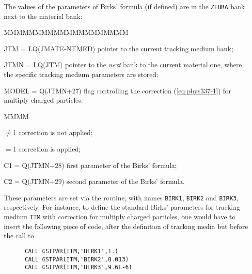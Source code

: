 The values of the parameters of Birks' formula (if defined) are in the
{\tt ZEBRA} bank next to the material bank:
\begin{DLtt}{MMMMMMMMMMMMMMMMMMMM}
\item[JTM = LQ(JMATE-NTMED)] pointer to the current tracking medium bank;
\item[JTMN = LQ(JTM)] pointer to the {\it next} bank to the current
material one, where the specific tracking medium parameters are stored;
\item[MODEL = Q(JTMN+27)] flag controlling the correction (\ref{eq:phys337-1})
for multiply charged particles:
\begin{DLtt}{MMMM}
\item[$\neq$1] correction is not applied;
\item[$=$1] correction is applied;
\end{DLtt}
\item[C1 = Q(JTMN+28)] first parameter of the Birks' formula;
\item[C2 = Q(JTMN+29)] second parameter of the Birks' formula.
\end{DLtt}
These parameters are set via the  routine, with
names {\tt BIRK1}, {\tt BIRK2} and {\tt BIRK3}, respectively. For instance,
to define the standard Birks' parameters for tracking medium {\tt ITM}
with correction for multiply charged particles, one would have to insert
the following piece of code, after the definition of tracking media
but before the call to 
\begin{verbatim}
      CALL GSTPAR(ITM,'BIRK1',1.)
      CALL GSTPAR(ITM,'BIRK2',0.013)
      CALL GSTPAR(ITM,'BIRK3',9.6E-6)
\end{verbatim}
